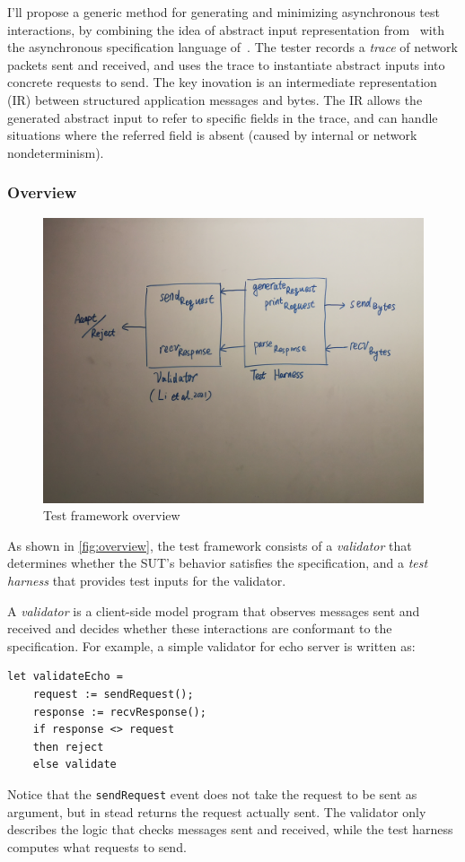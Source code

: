 \documentclass{article}
\newcommand{\ilc}[1]{\lstinline[style=customcoq]{#1}}
\theoremstyle{definition}
\begin{document}
I'll propose a generic method for generating and minimizing asynchronous test
interactions, by combining the idea of abstract input representation
from~\textcite{Hughes2007} with the asynchronous specification language
of~\textcite{li2021modelbased}.  The tester records a {\em trace} of network
packets sent and received, and uses the trace to instantiate abstract inputs
into concrete requests to send.  The key inovation is an intermediate
representation (IR) between structured application messages and bytes.  The IR
allows the generated abstract input to refer to specific fields in the trace,
and can handle situations where the referred field is absent (caused by internal
or network nondeterminism).

\subsubsection{Overview}
\begin{figure}
  \centering
  \includegraphics[width=.9\textwidth]{figures/overview}
  \caption{Test framework overview}
  \label{fig:overview}
\end{figure}

As shown in \autoref{fig:overview}, the test framework consists of a {\em
  validator} that determines whether the SUT's behavior satisfies the
specification, and a {\em test harness} that provides test inputs for the
validator.

A {\em validator} is a client-side model program that observes messages sent and
received and decides whether these interactions are conformant to the
specification.  For example, a simple validator for echo server is written as:
\begin{lstlisting}[style=customcoq]
  let validateEcho =
    request := sendRequest();
    response := recvResponse();
    if response <> request
    then reject
    else validate
\end{lstlisting}
Notice that the \ilc{sendRequest} event does not take the request to be sent as
argument, but in stead returns the request actually sent.  The validator only
describes the logic that checks messages sent and received, while the test
harness computes what requests to send.
\end{document}
